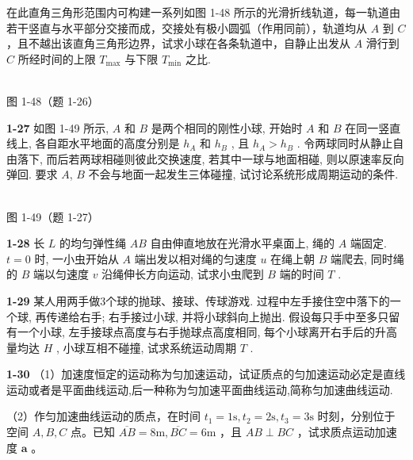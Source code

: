在此直角三角形范围内可构建一系列如图 1-48 所示的光滑折线轨道，每一轨道由若干竖直与水平部分交接而成，交接处有极小圆弧（作用同前），轨道均从 $A$ 到 $C$ ，且不越出该直角三角形边界，试求小球在各条轨道中，自静止出发从 $A$ 滑行到 $C$ 所经时间的上限 $T_{\mathrm{max}}$ 与下限 $T_{\mathrm{min}}$ 之比.

\begin{center}
\resizebox{0.36\textwidth}{!}{}\\[4pt]
{\small 图 1-48（题 1-26）}
\end{center}

\newpage

\textbf{1-27} 如图 1-49 所示, $A$ 和 $B$ 是两个相同的刚性小球, 开始时 $A$ 和 $B$ 在同一竖直线上, 各自距水平地面的高度分别是 $h_{A}$ 和 $h_{B}$ , 且 $h_{A} > h_{B}$ . 令两球同时从静止自由落下, 而后若两球相碰则彼此交换速度, 若其中一球与地面相碰, 则以原速率反向弹回. 要求 $A$, $B$ 不会与地面一起发生三体碰撞, 试讨论系统形成周期运动的条件.

\begin{center}
\resizebox{0.34\textwidth}{!}{}\\[4pt]
{\small 图 1-49（题 1-27）}
\end{center}

\newpage

\textbf{1-28} 长 $L$ 的均匀弹性绳 $AB$ 自由伸直地放在光滑水平桌面上, 绳的 $A$ 端固定. $t = 0$ 时, 一小虫开始从 $A$ 端出发以相对绳的匀速度 $u$ 在绳上朝 $B$ 端爬去, 同时绳的 $B$ 端以匀速度 $v$ 沿绳伸长方向运动, 试求小虫爬到 $B$ 端的时间 $T$ .

\newpage

\textbf{1-29} 某人用两手做3个球的抛球、接球、传球游戏. 过程中左手接住空中落下的一个球, 再传递给右手; 右手接过小球, 并将小球斜向上抛出. 假设每只手中至多只留有一个小球, 左手接球点高度与右手抛球点高度相同, 每个小球离开右手后的升高量均达 $H$ , 小球互相不碰撞, 试求系统运动周期 $T$ .

\newpage

\textbf{1-30} （1）加速度恒定的运动称为匀加速运动，试证质点的匀加速运动必定是直线运动或者是平面曲线运动,后一种称为匀加速平面曲线运动,简称匀加速曲线运动.

（2）作匀加速曲线运动的质点，在时间 $t_1 = 1\mathrm{s}, t_2 = 2\mathrm{s}, t_3 = 3\mathrm{s}$ 时刻，分别位于空间 $A, B, C$ 点。已知 $\overline{AB} = 8\mathrm{m}, \overline{BC} = 6\mathrm{m}$ ，且 $AB \perp BC$ ，试求质点运动加速度 $\pmb{a}$ 。


